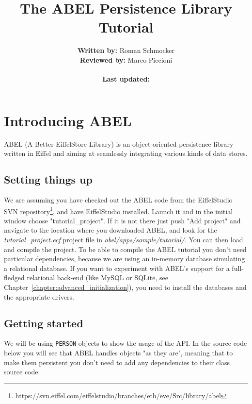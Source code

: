\documentclass[a4paper,12pt]{report}
\title {The ABEL Persistence Library Tutorial}
\author {
	\textbf{Written by:} Roman Schmocker\\
	\textbf{Reviewed by:} Marco Piccioni\\\\
	\textbf{Last updated:}
}
\newcommand{\blankpage}{
\newpage
\thispagestyle{empty}
\mbox{}
\newpage
}
\begin{document}
\maketitle


%


\tableofcontents



%

\chapter{Introducing ABEL}
ABEL (A Better EiffelStore Library) is an object-oriented persistence library written in Eiffel and aiming at seamlessly integrating various kinds of data stores.
 
\section{Setting things up}
We are assuming you have checked out the ABEL code from the EiffelStudio SVN repository\footnote{https://svn.eiffel.com/eiffelstudio/branches/eth/eve/Src/library/abel}, and have EiffelStudio installed. Launch it and in the initial window choose "tutorial\_project". If it is not there just push "Add project" and navigate to the location where you downloaded ABEL, and look for the \emph{tutorial\_project.ecf} project file in \emph{abel/apps/sample/tutorial/}. You can then load and compile the project. To be able to compile the ABEL tutorial you don't need particular dependencies, because we are using an in-memory database simulating a relational database. If you want to experiment with ABEL's support for a full-fledged relational back-end (like MySQL or SQLite, see Chapter~\ref{chapter:advanced_initialization}), you need to install the databases and the appropriate drivers.

\section{Getting started}
We will be using \lstinline!PERSON! objects to show the usage of the API. 
In the source code below you will see that ABEL handles objects "as they are", meaning that to make them persistent you don't need to add any dependencies to their class source code.
\end{document}
